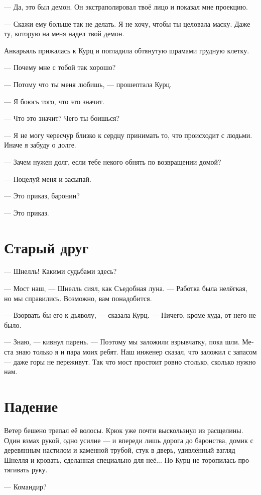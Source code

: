 \documentclass[a4paper,10pt,fleqn]{book}\usepackage{polyglossia}\setdefaultlanguage[babelshorthands=true]{russian}\setotherlanguage{english}\defaultfontfeatures{Ligatures=TeX,Mapping=tex-text}\usepackage{xcolor}\newcommand{\ml}[3]{#2}
\begin{document}
--- Да, это был демон.
Он экстраполировал твоё лицо и показал мне проекцию.

--- Скажи ему больше так не делать.
Я не хочу, чтобы ты целовала маску.
Даже ту, которую на меня надел твой демон.

Анкарьяль прижалась к Курц и погладила обтянутую шрамами грудную клетку.

--- Почему мне с тобой так хорошо?

--- Потому что ты меня любишь, --- прошептала Курц.

--- Я боюсь того, что это значит.

--- Что это значит?
Чего ты боишься?

--- Я не могу чересчур близко к сердцу принимать то, что происходит с людьми.
Иначе я забуду о долге.

--- Зачем нужен долг, если тебе некого обнять по возвращении домой?

--- Поцелуй меня и засыпай.

--- Это приказ, баронин?

--- Это приказ.

\section{Старый друг}

--- Шнелль!
Какими судьбами здесь?

--- Мост наш, --- Шнелль сиял, как Съедобная луна.
--- Работка была нелёгкая, но мы справились.
Возможно, вам понадобится.

--- Взорвать бы его к дьяволу, --- сказала Курц.
--- Ничего, кроме худа, от него не было.

--- Знаю, --- кивнул парень.
--- Поэтому мы заложили взрывчатку, пока шли.
Места знаю только я и пара моих ребят.
Наш инженер сказал, что заложил с запасом --- даже горы не переживут.
Так что мост простоит ровно столько, сколько нужно нам.

\section{Падение}

Ветер бешено трепал её волосы.
Крюк уже почти выскользнул из расщелины.
Один взмах рукой, одно усилие --- и впереди лишь дорога до баронства, домик с деревянным настилом и каменной трубой, стук в дверь, удивлённый взгляд Шнелля и кровать, сделанная специально для неё...
Но Курц не торопилась протягивать руку.

--- Командир?
\end{document}
